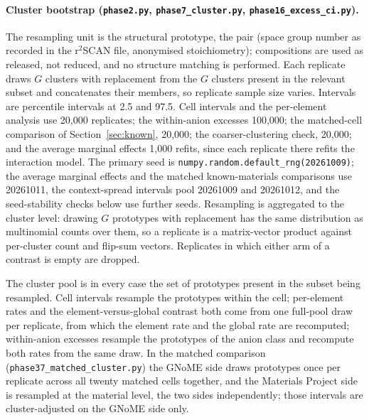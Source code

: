 \documentclass[11pt]{article}
\begin{document}
\paragraph{Cluster bootstrap (\texttt{phase2.py}, \texttt{phase7\_cluster.py},
\texttt{phase16\_excess\_ci.py}).} The resampling unit is the structural prototype, the
pair (space group number as recorded in the r$^2$SCAN file, anonymised stoichiometry);
compositions are used as released, not reduced, and no structure matching is performed.
Each replicate draws $G$ clusters with replacement from the $G$ clusters present in the
relevant subset and concatenates their members, so replicate sample size varies.
Intervals are percentile intervals at 2.5 and 97.5. Cell intervals and the per-element
analysis use 20{,}000 replicates; the within-anion excesses 100{,}000; the matched-cell
comparison of Section~\ref{sec:known}, 20{,}000; the coarser-clustering check, 20{,}000;
and the average marginal effects 1{,}000 refits, since each replicate there refits the
interaction model. The primary seed is \texttt{numpy.random.default\_rng(20261009)}; the average
marginal effects and the matched known-materials comparisons use 20261011, the context-spread intervals pool 20261009 and 20261012,
and the seed-stability checks below use further seeds.
Resampling is aggregated to the cluster level: drawing $G$ prototypes with replacement
has the same distribution as multinomial counts over them, so a replicate is a
matrix-vector product against per-cluster count and flip-sum vectors. Replicates in
which either arm of a contrast is empty are dropped.

The cluster pool is in every case the set of prototypes present in the subset being
resampled. Cell intervals resample the prototypes within the cell; per-element rates and the
element-versus-global contrast both come from one full-pool draw per replicate, from which
the element rate and the global rate are recomputed; within-anion excesses resample the prototypes of the anion
class and recompute both rates from the same draw. In the matched comparison
(\texttt{phase37\_matched\_cluster.py}) the GNoME side draws prototypes once per
replicate across all twenty matched cells together, and the Materials Project side is
resampled at the material level, the two sides independently; those intervals are
cluster-adjusted on the GNoME side only.
\end{document}
